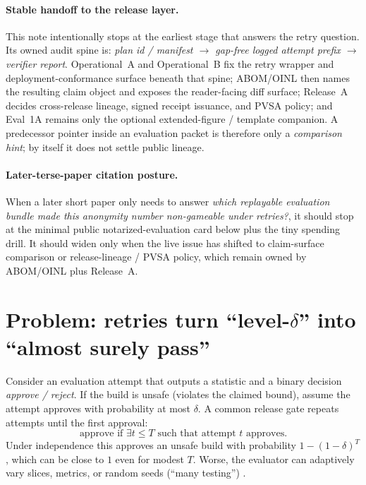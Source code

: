 \documentclass[11pt]{article}
\begin{document}
\paragraph{Stable handoff to the release layer.}
This note intentionally stops at the earliest stage that answers the retry question.
Its owned audit spine is: \emph{plan id / manifest $\rightarrow$ gap-free logged attempt prefix $\rightarrow$ verifier report}.
Operational~A and Operational~B fix the retry wrapper and deployment-conformance surface beneath that spine; ABOM/OINL then names the resulting claim object and exposes the reader-facing diff surface; Release~A decides cross-release lineage, signed receipt issuance, and PVSA policy; and Eval~1A remains only the optional extended-figure / template companion.\cite{series:abomoinl,series:releaseproperty,series:evalnotaryaddendum}
A predecessor pointer inside an evaluation packet is therefore only a \emph{comparison hint}; by itself it does not settle public lineage.

\paragraph{Later-terse-paper citation posture.}
When a later short paper only needs to answer \emph{which replayable evaluation bundle made this anonymity number non-gameable under retries?}, it should stop at the minimal public notarized-evaluation card below plus the tiny spending drill.
It should widen only when the live issue has shifted to claim-surface comparison or release-lineage / PVSA policy, which remain owned by ABOM/OINL plus Release~A.\cite{series:abomoinl,series:releaseproperty}

\section{Problem: retries turn \texorpdfstring{``level-$\delta$''}{``level-delta''} into ``almost surely pass''}
Consider an evaluation attempt that outputs a statistic and a binary decision \emph{approve / reject}.
If the build is unsafe (violates the claimed bound), assume the attempt approves with probability at most $\delta$.
A common release gate repeats attempts until the first approval:
\[
\text{approve if } \exists t \le T \text{ such that attempt $t$ approves.}
\]
Under independence this approves an unsafe build with probability $1-(1-\delta)^T$, which can be close to $1$ even for modest $T$.
Worse, the evaluator can adaptively vary slices, metrics, or random seeds (``many testing'') \cite{series:manytestinglowerbounds}.
\end{document}
